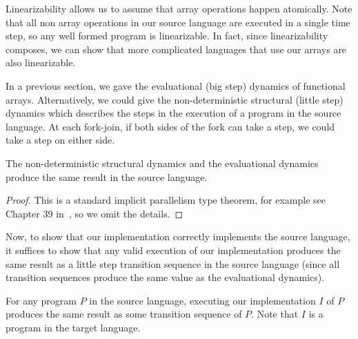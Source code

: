 \documentclass[preprint]{sigplanconf}
\begin{document}
Linearizability allows us to assume that array operations happen atomically. Note that all non array operations in our source language are executed in a single time step, so any well formed program is linearizable. In fact, since linearizability composes, we can show that more complicated languages that use our arrays are also linearizable.

In a previous section, we gave the evaluational (big step) dynamics of functional arrays. Alternatively, we could give the non-deterministic structural (little step) dynamics which describes the steps in the execution of a program in the source language. At each fork-join, if both sides of the fork can take a step, we could take a step on either side.

\begin{theorem}
The non-deterministic structural dynamics and the evaluational dynamics produce the same result in the source language.
\end{theorem}

\begin{proof}
This is a standard implicit parallelism type theorem, for example see Chapter 39 in~\cite{harper}, so we omit the details. 
\end{proof}

Now, to show that our implementation correctly implements the source language, it suffices to show that any valid execution of our implementation produces the same result as a little step transition sequence in the source language (since all transition sequences produce the same value as the evaluational dynamics).
 
\begin{theorem}
For any program $P$ in the source language, executing our implementation $I$ of $P$ produces the same result as some transition sequence of $P$. Note that $I$ is a program in the target language.
\end{theorem}
\end{document}
